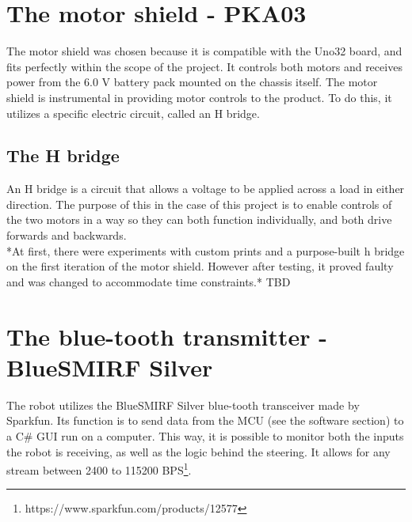 \section{The motor shield - PKA03}
The motor shield was chosen because it is compatible with the Uno32 board, and fits perfectly within the scope of the project. It controls both motors and receives power from the 6.0 V battery pack mounted on the chassis itself. The motor shield is instrumental in providing motor controls to the product. To do this, it utilizes a specific electric circuit, called an H bridge.

\subsection{The H bridge}
An H bridge is a circuit that allows a voltage to be applied across a load in either direction. The purpose of this in the case of this project is to enable controls of the two motors in a way so they can both function individually, and both drive forwards and backwards.\\

*At first, there were experiments with custom prints and a purpose-built h bridge on the first iteration of the motor shield. However after testing, it proved faulty and was changed to accommodate time constraints.* TBD

\section{The blue-tooth transmitter - BlueSMIRF Silver}
The robot utilizes the BlueSMIRF Silver blue-tooth transceiver made by Sparkfun. Its function is to send data from the MCU (see the software section) to a C\# GUI run on a computer. This way, it is possible to monitor both the inputs the robot is receiving, as well as the logic behind the steering. It allows for any stream between 2400 to 115200 BPS\footnote{https://www.sparkfun.com/products/12577}. 

